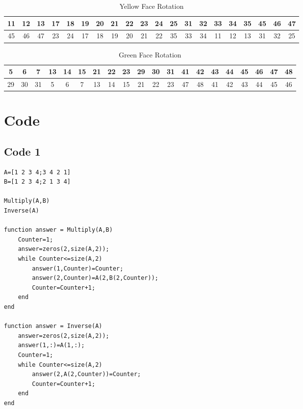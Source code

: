 \documentclass[10pt,a4paper,notitlepage]{article}
\begin{document}
\begin{table}[H]
\centering
\begin{tabular}{|cccccccccccccccccccc|} \hline
11&12&13&17&18&19&20&21&22&23&24&25&31&32&33&34&35&45&46&47\\ \hline 45&46&47&23&24&17&18&19&20&21&22&35&33&34&11&12&13&31&32&25\\ \hline 
\end{tabular}
\caption{Yellow Face Rotation}
\end{table}
\begin{table}[H]
\centering
\begin{tabular}{|cccccccccccccccccccc|} \hline
5&6&7&13&14&15&21&22&23&29&30&31&41&42&43&44&45&46&47&48\\ \hline 29&30&31&5&6&7&13&14&15&21&22&23&47&48&41&42&43&44&45&46\\ \hline 
\end{tabular}
\caption{Green Face Rotation}
\end{table}

\pagebreak
\section*{\centering Code}
\subsection*{\centering Code 1}\label{cd:1}
\begin{verbatim}
A=[1 2 3 4;3 4 2 1]
B=[1 2 3 4;2 1 3 4]

Multiply(A,B)
Inverse(A)

function answer = Multiply(A,B)
    Counter=1;
    answer=zeros(2,size(A,2));
    while Counter<=size(A,2)
        answer(1,Counter)=Counter;
        answer(2,Counter)=A(2,B(2,Counter));
        Counter=Counter+1;
    end
end

function answer = Inverse(A)
    answer=zeros(2,size(A,2));
    answer(1,:)=A(1,:);
    Counter=1;
    while Counter<=size(A,2)
        answer(2,A(2,Counter))=Counter;
        Counter=Counter+1;
    end
end
\end{verbatim}
\pagebreak
\end{document}
